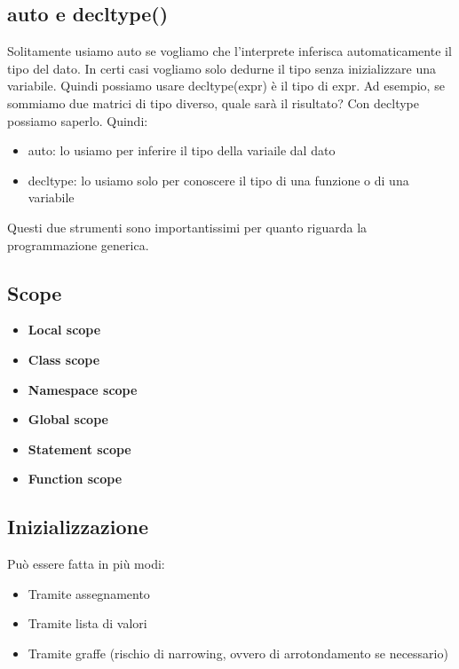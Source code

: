 \documentclass[11pt,a4paper]{book}
\begin{document}
\subsection{auto e decltype()}
Solitamente usiamo auto se vogliamo che l'interprete inferisca automaticamente il tipo del dato. In certi casi vogliamo solo dedurne il tipo senza inizializzare una variabile. Quindi possiamo usare decltype(expr) è il tipo di expr. Ad esempio, se sommiamo due matrici di tipo diverso, quale sarà il risultato? Con decltype possiamo saperlo.
\label{code: 065}
Quindi:
\begin{itemize}
	\item auto: lo usiamo per inferire il tipo della variaile dal dato
	\item decltype: lo usiamo solo per conoscere il tipo di una funzione o di una variabile
\end{itemize}

Questi due strumenti sono importantissimi per quanto riguarda la programmazione generica.

\subsection{Scope}
\begin{itemize}
	\item \textbf{Local scope}
	\item \textbf{Class scope}
	\item \textbf{Namespace scope}
	\item \textbf{Global scope}
	\item \textbf{Statement scope}
	\item \textbf{Function scope}
\end{itemize}

\subsection{Inizializzazione}
Può essere fatta in più modi:
\begin{itemize}
	\item Tramite assegnamento
	\item Tramite lista di valori
	\item Tramite graffe (rischio di narrowing, ovvero di arrotondamento se necessario)
\end{itemize}
\label{code: 066}
\end{document}
